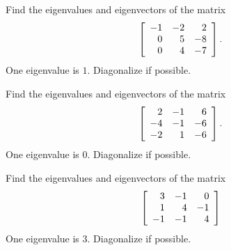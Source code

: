 \documentclass{ximera}
\begin{document}
\begin{example}
  Find the eigenvalues and eigenvectors of the matrix
  \begin{equation*}
    \startmat{rrr}
      -1 & -2 & 2 \\
      0 & 5 & -8 \\
      0 & 4 & -7 \\
    \stopmat.
  \end{equation*}
  One eigenvalue is $1$. Diagonalize if possible.
\end{example}

\begin{example}
  Find the eigenvalues and eigenvectors of the matrix
  \begin{equation*}
    \startmat{rrr}
      2 &  -1 &   6 \\
      -4 &  -1 &  -6 \\
      -2 &   1 &  -6 \\
    \stopmat.
  \end{equation*}
  One eigenvalue is $0$. Diagonalize if possible.
\end{example}

\begin{example}
  Find the eigenvalues and eigenvectors of the matrix
  \begin{equation*}
    \startmat{rrr}
      3 &  -1 &   0 \\
      1 &   4 &  -1 \\
      -1 & -1 &   4 \\
    \stopmat
  \end{equation*}
  One eigenvalue is $3$. Diagonalize if possible.
\end{example}
\end{document}
